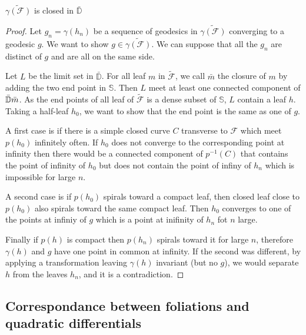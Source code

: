 \begin{lem}
$\tilde{\gamma(\mathcal{F})}$ is closed in $\bar{\mathbb{D}}$
\end{lem}

\begin{proof}

Let $g_n=\gamma(h_n)$ be a sequence of geodesics in $\tilde{\gamma(\mathcal{F})}$ converging to a geodesic $g$. We want to show $g \in \tilde{\gamma(\mathcal{F})}$. We can suppose that all the $g_n$ are distinct of $g$ and are all on the same side.

\smallbreak
Let $L$ be the limit set in $\bar{\mathbb{D}}$. For all leaf $m$ in $\tilde{\mathcal{F}}$, we call $\bar{m}$ the closure of $m$
 by adding the two end point in $\mathbb{S}$. Then $L$ meet at least one connected component of $\bar{\mathbb{D}} \\ \bar{m} $. As the end points of all leaf of $\tilde{\mathcal{F}}$ is a dense subset of $\mathbb{S}$, $L$ contain a leaf $h$. Taking a half-leaf $h_0$, we want to show that the end point is the same as one of $g$.

\smallbreak
A first case is if there is a simple closed curve $C$  transverse to $\mathcal{F}$ which meet $p(h_0)$ infinitely often. If $h_0$ does not converge to the corresponding point at infinity then there would be a connected component of $p^{-1}(C)$ that contains the point of infinity of $h_0$ but does not contain the point of infiny of $h_n$ which is impossible for large $n$.

\smallbreak
A second case is if $p(h_0)$ spirals toward a compact leaf, then closed leaf close to $p(h_0)$ also spirals toward the same compact leaf. Then $h_0$ converges to one of the points at infiniy of $g$ which is a point at inifinity of $h_n$ fot $n$ large.
\smallbreak

Finally if $p(h)$ is compact then $p(h_n)$ spirals toward it for large $n$, therefore $\gamma(h)$ and $g$ have one point in common at infinity. If the second was different, by applying a transformation leaving $\gamma(h)$ invariant (but no $g$), we would separate $h$ from the leaves $h_n$, and it is a contradiction.
\end{proof}

\subsection{Correspondance between foliations and quadratic differentials}


